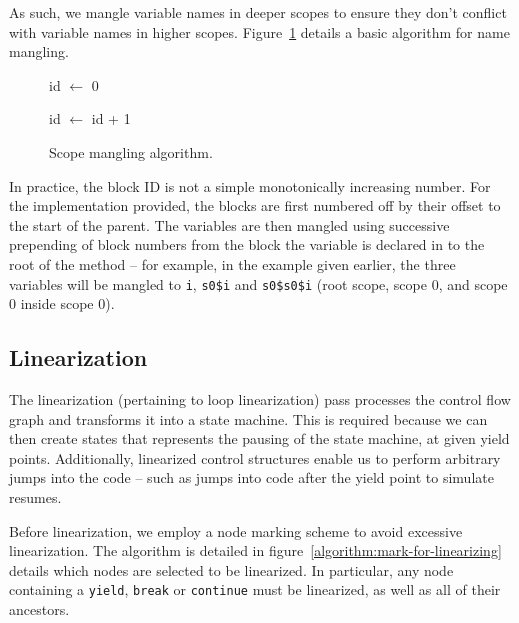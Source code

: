 \documentclass[journal,a4paper]{IEEEtran}
\begin{document}
As such, we mangle variable names in deeper scopes to ensure they don't conflict with variable
names in higher scopes. Figure~\ref{algorithm:scope-mangling} details a basic algorithm for name
mangling.

\begin{figure}
\begin{algorithmic}
    \State id $\gets$ 0
            \State {}
        \EndFor

                \State {}
            \EndFor
        \EndFor
        \State id $\gets$ id + 1
    \EndFor
\EndFunction
\end{algorithmic}
\caption{Scope mangling algorithm.}
\label{algorithm:scope-mangling}
\end{figure}

In practice, the block ID is not a simple monotonically increasing number. For the implementation
provided, the blocks are first numbered off by their offset to the start of the parent. The
variables are then mangled using successive prepending of block numbers from the block the variable
is declared in to the root of the method -- for example, in the example given earlier, the three
variables will be mangled to \texttt{i}, \texttt{s0\$i} and \texttt{s0\$s0\$i} (root scope, scope
0, and scope 0 inside scope 0).

\subsection{Linearization} \label{section:linearization}

The linearization (pertaining to loop linearization) pass processes the control flow graph and
transforms it into a state machine. This is required because we can then create states that
represents the pausing of the state machine, at given yield points. Additionally, linearized
control structures enable us to perform arbitrary jumps into the code -- such as jumps into code
after the yield point to simulate resumes.

Before linearization, we employ a node marking scheme to avoid excessive linearization. The
algorithm is detailed in figure~\ref{algorithm:mark-for-linearizing} details which nodes are
selected to be linearized. In particular, any node containing a \texttt{yield}, \texttt{break} or
\texttt{continue} must be linearized, as well as all of their ancestors.
\end{document}
